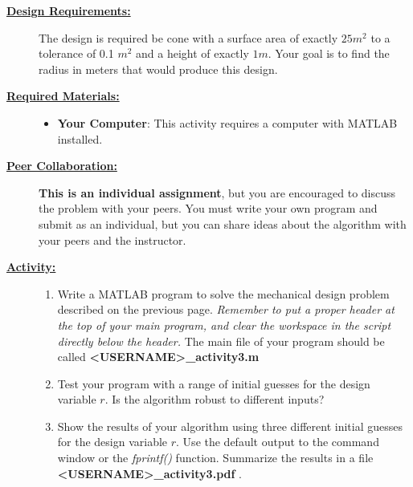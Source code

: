 \documentclass[12pt]{article}
\newcommand{\ANUM}{3} %
\begin{document}
\begin{description}
\item[\textbf{\underline{Design Requirements:}}] \hfill \vspace{0mm}

	The design is required be cone with a surface area of exactly $25 m^2$ to a tolerance of 0.1 $m^2$ and a height of exactly $1 m$. Your goal is to find the radius in meters that would produce this design.\\
	
\item[\textbf{\underline{Required Materials:}}] \hfill \vspace{0mm}

\begin{itemize}
	\item {\bf Your Computer}: This activity requires a computer with MATLAB installed.
\end{itemize}

\item[\textbf{\underline{Peer Collaboration:}}] \hfill \vspace{0mm}

{\bf This is an individual assignment}, but you are encouraged to discuss the problem with your peers. You must write your own program and submit as an individual, but you can share ideas about the algorithm with your peers and the instructor.

\newpage

\item[\textbf{\underline{Activity:}}] \hfill \vspace{0mm}

\begin{enumerate}
	

	\item Write a MATLAB program to solve the mechanical design problem described on the previous page. {\it Remember to put a proper header at the top of your main program, and clear the workspace in the script directly below the header. } The main file of your program should be called {\bf \BL<USERNAME>\BK\_activity\ANUM.m}
	
	\item Test your program with a range of initial guesses for the design variable $r$. Is the algorithm robust to different inputs? 
	
	\item Show the results of your algorithm using three different initial guesses for the design variable $r$. Use the default output to the command window or the {\it fprintf()} function. Summarize the results in a file {\bf \BL<USERNAME>\BK\_activity\ANUM.pdf }.
	

\end{enumerate}
\end{description}
\end{document}

